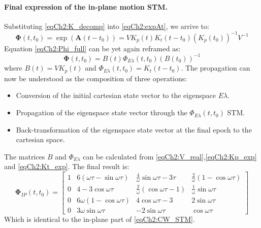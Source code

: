 		\paragraph{ Final expression of the in-plane motion STM. \\}
		\indent Substituting \eqref{eqCh2:K_decomp} into \eqref{eqCh2:expAt}, we arrive to:
		\begin{equation}
		\bm \Phi(t, t_0) = \exp \left(\bm A (t - t_0)\right) = V K_p(t) K_t(t - t_0) \left(K_p(t_0)\right)^{-1} V^{-1}
		\label{eqCh2:Phi_full}
		\end{equation}
		\indent Equation \eqref{eqCh2:Phi_full} can be yet again reframed as:
		\begin{equation}
		\bm \Phi(t, t_0) = B(t) \Phi_{E\lambda} (t, t_0) \left(B(t_0)\right)^{-1}
		\label{eqCh2:Phi_full_V2}
		\end{equation}
		\noindent where $B(t) = V K_p(t)$ and $\Phi_{E\lambda} (t, t_0) = K_t(t - t_0)$. The propagation can now be understood as the composition of three operations:
		\begin{itemize}
		\item[\GMVred{\nth{1}}] Conversion of the initial cartesian state vector to the eigenspace $E\lambda$.
		\item[\GMVred{\nth{2}}] Propagation of the eigenspace state vector through the $\Phi_{E\lambda} (t, t_0)$ STM.
		\item[\GMVred{\nth{3}}] Back-transformation of the eigenspace state vector at the final epoch to the cartesian space.
		\end{itemize}
		\indent The matrices $B$ and $\Phi_{E\lambda}$ can be calculated from \eqref{eqCh2:V_real},\eqref{eqCh2:Kp_exp} and \eqref{eqCh2:Kt_exp}. The final result is:
		\begin{equation}
		\bm \Phi_{IP} (t, t_0) = \left[
		\begin{array}{cccc}
		1	& 6(\omega\tau - \sin\omega\tau)	& \frac{4}{\omega} \sin\omega\tau - 3\tau	& \frac{2}{\omega} (1 - \cos\omega\tau) \\
		0	& 4 - 3 \cos\omega\tau				& \frac{2}{\omega} (\cos\omega\tau - 1)		& \frac{1}{\omega} \sin\omega\tau\\
		0	& 6\omega (1 - \cos\omega\tau)		& 4\cos\omega\tau - 3						& 2\sin\omega\tau	\\
		0	& 3\omega\sin\omega\tau 			& -2 \sin\omega\tau							& \cos\omega\tau
		\end{array}\right]
		\label{eqCh2:phi_IP}
		\end{equation}
		\indent Which is identical to the in-plane part of \eqref{eqCh2:CW_STM}.
